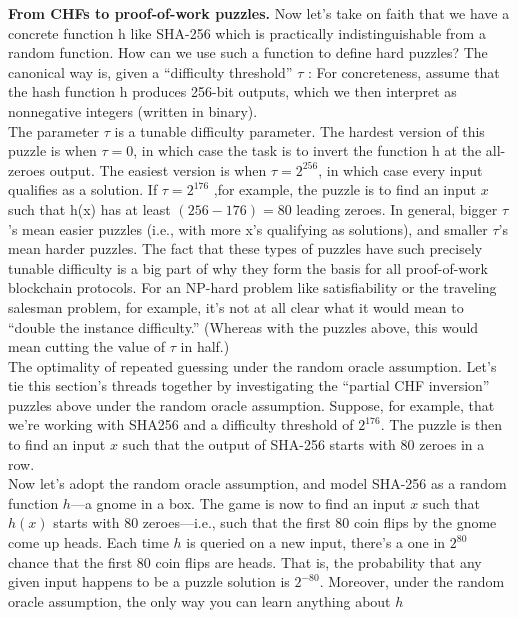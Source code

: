 \noindent
\textbf{From CHFs to proof-of-work puzzles.} Now let’s take on faith that we have a concrete
function h like SHA-256 which is practically indistinguishable from a random function. How
can we use such a function to define hard puzzles? The canonical way is, given a “difficulty
threshold” $\tau$ :
For concreteness, assume that the hash function h produces 256-bit outputs, which we then
interpret as nonnegative integers (written in binary).\\
The parameter $\tau$ is a tunable difficulty parameter. The hardest version of this puzzle is
when $\tau = 0$, in which case the task is to invert the function h at the all-zeroes output. The
easiest version is when $\tau = 2^{256}$, in which case every input qualifies as a solution. If $\tau = 2^176$ ,for example, the puzzle is to find an input $x$ such that h(x) has at least $(256 - 176) = 80$
leading zeroes. In general, bigger $\tau$ ’s mean easier puzzles (i.e., with more x’s qualifying as
solutions), and smaller $\tau$’s mean harder puzzles.
The fact that these types of puzzles have such precisely tunable difficulty is a big part of
why they form the basis for all proof-of-work blockchain protocols. For an NP-hard problem
like satisfiability or the traveling salesman problem, for example, it’s not at all clear what
it would mean to “double the instance difficulty.” (Whereas with the puzzles above, this
would mean cutting the value of $\tau$ in half.)\\
The optimality of repeated guessing under the random oracle assumption. Let’s
tie this section’s threads together by investigating the “partial CHF inversion” puzzles above
under the random oracle assumption. Suppose, for example, that we’re working with SHA256 and a difficulty threshold of $2^176$. The puzzle is then to find an input $x$ such that the
output of SHA-256 starts with 80 zeroes in a row.\\
Now let’s adopt the random oracle assumption, and model SHA-256 as a random function $h$—a gnome in a box. The game is now to find an input $x$ such that $h(x)$ starts with 80
zeroes—i.e., such that the first 80 coin flips by the gnome come up heads. Each time $h$ is
queried on a new input, there’s a one in $2^{80}$ chance that the first 80 coin flips are heads.
That is, the probability that any given input happens to be a puzzle solution is $2^{-80}$. Moreover, under the random oracle assumption, the only way you can learn anything about $h$

